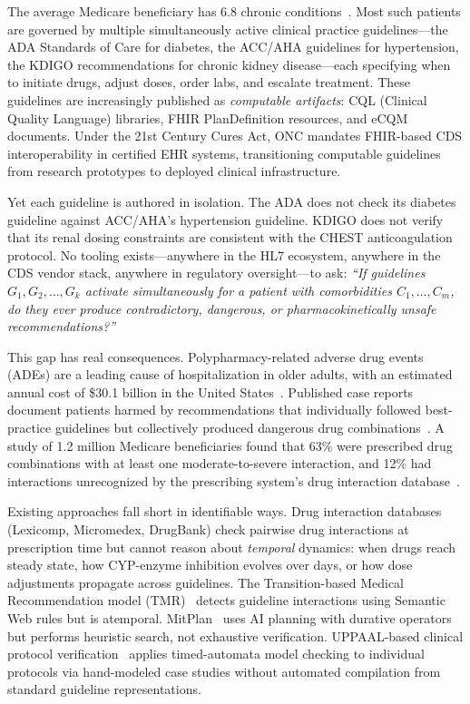 \documentclass{article}
\theoremstyle{definition}
\begin{document}
The average Medicare beneficiary has 6.8 chronic conditions~\cite{cms2019chronic}. Most such patients are governed by multiple simultaneously active clinical practice guidelines---the ADA Standards of Care for diabetes, the ACC/AHA guidelines for hypertension, the KDIGO recommendations for chronic kidney disease---each specifying when to initiate drugs, adjust doses, order labs, and escalate treatment. These guidelines are increasingly published as \emph{computable artifacts}: CQL (Clinical Quality Language) libraries, FHIR PlanDefinition resources, and eCQM documents. Under the 21st Century Cures Act, ONC mandates FHIR-based CDS interoperability in certified EHR systems, transitioning computable guidelines from research prototypes to deployed clinical infrastructure.

Yet each guideline is authored in isolation. The ADA does not check its diabetes guideline against ACC/AHA's hypertension guideline. KDIGO does not verify that its renal dosing constraints are consistent with the CHEST anticoagulation protocol. No tooling exists---anywhere in the HL7 ecosystem, anywhere in the CDS vendor stack, anywhere in regulatory oversight---to ask: \emph{``If guidelines $G_1, G_2, \ldots, G_k$ activate simultaneously for a patient with comorbidities $C_1, \ldots, C_m$, do they ever produce contradictory, dangerous, or pharmacokinetically unsafe recommendations?''}

This gap has real consequences. Polypharmacy-related adverse drug events (ADEs) are a leading cause of hospitalization in older adults, with an estimated annual cost of \$30.1 billion in the United States~\cite{budnitz2011emergency}. Published case reports document patients harmed by recommendations that individually followed best-practice guidelines but collectively produced dangerous drug combinations~\cite{boyd2005clinical}. A study of 1.2 million Medicare beneficiaries found that 63\% were prescribed drug combinations with at least one moderate-to-severe interaction, and 12\% had interactions unrecognized by the prescribing system's drug interaction database~\cite{qato2016changes}.

Existing approaches fall short in identifiable ways. Drug interaction databases (Lexicomp, Micromedex, DrugBank) check pairwise drug interactions at prescription time but cannot reason about \emph{temporal} dynamics: when drugs reach steady state, how CYP-enzyme inhibition evolves over days, or how dose adjustments propagate across guidelines. The Transition-based Medical Recommendation model (TMR)~\cite{zamborlini2017} detects guideline interactions using Semantic Web rules but is atemporal. MitPlan~\cite{wilk2021mitplan} uses AI planning with durative operators but performs heuristic search, not exhaustive verification. UPPAAL-based clinical protocol verification~\cite{uppaal_medical} applies timed-automata model checking to individual protocols via hand-modeled case studies without automated compilation from standard guideline representations.
\end{document}
